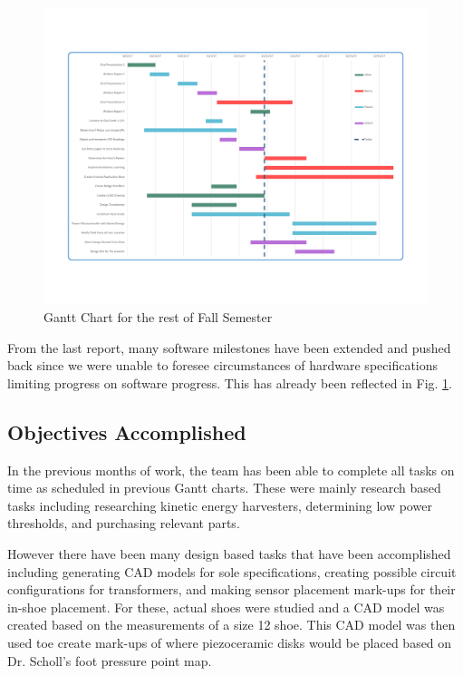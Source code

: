 \documentclass[letterpaper, 12 pt, onecolumn, hidelinks]{ieeetran}
\begin{document}
\begin{figure}
	\begin{center}
		\includegraphics[trim=55 125 75 117, clip, width=\columnwidth]{GanttChart.pdf}
	\end{center}
	\vspace{-1em}
	\caption{\label{fig:Gantt}Gantt Chart for the rest of Fall Semester}
\end{figure}

From the last report, many software milestones have been extended and pushed back since we were unable to foresee circumstances of hardware specifications limiting progress on software progress. This has already been reflected in Fig. \ref{fig:Gantt}. 

\subsection{Objectives Accomplished}\label{sec:Accomplished}
In the previous months of work, the team has been able to complete all tasks on time as scheduled in previous Gantt charts. These were mainly research based tasks including researching kinetic energy harvesters, determining low power thresholds, and purchasing relevant parts. 

However there have been many design based tasks that have been accomplished including generating CAD models for sole specifications, creating possible circuit configurations for transformers, and making sensor placement mark-ups for their in-shoe placement. For these, actual shoes were studied and a CAD model was created based on the measurements of a size 12 shoe. This CAD model was then used toe create mark-ups of where piezoceramic disks would be placed based on Dr. Scholl's foot pressure point map.
\end{document}
